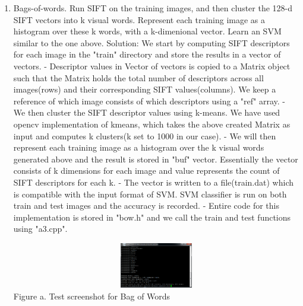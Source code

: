 \documentclass{article}
\begin{document}
\begin{enumerate}
		\item Bags-of-words. Run SIFT on the training images, and
		then cluster the 128-d SIFT vectors into k visual words. Represent each training image as a histogram over these k words, with a k-dimenional vector. Learn an SVM similar to the one above. \newline \newline
		Solution: We start by computing SIFT descriptors for each image in the "train" directory and store the results in a vector of vectors. \newline
		- Descriptor values in Vector of vectors is copied to a Matrix object such that the Matrix holds the total number of descriptors across all images(rows) and their corresponding SIFT values(columns). We keep a reference of which image consists of which descriptors using a "ref" array. \newline
		- We then cluster the SIFT descriptor values using k-means. We have used opencv implementation of kmeans, which takes the above created Matrix as input and computes k clusters(k set to 1000 in our case). \newline
		- We will then represent each training image as a histogram over the k visual words generated above and the result is stored in "buf" vector. Essentially the vector consists of k dimensions for each image and value represents the count of SIFT descriptors for each k. \newline
		- The vector is written to a file(train.dat) which is compatible with the input format of SVM. SVM classifier is run on both train and test images and the accuracy is recorded. \newline
		- Entire code for this implementation is stored in "bow.h" and we call the train and test functions using "a3.cpp". \newline
		\begin{center}
			\includegraphics[width=14cm, height=2cm]{bow.png} \\
			Figure a. Test screenshot for Bag of Words
		\end{center}
	\end{enumerate}
	
\end{document}
